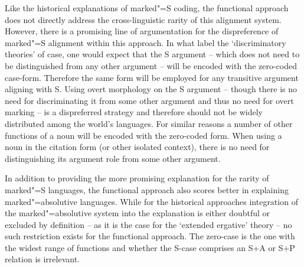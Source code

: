 Like the historical explanations of marked"=S coding, the functional approach does not directly address the cross-linguistic rarity of this alignment system.
However, there is a promising line of argumentation for the dispreference of marked"=S alignment within this approach.
In what \citet[91--93]{Mallinson:1981} label the `discriminatory theories' of case, one would expect that the S argument -- which does not need to be distinguished from any other argument -- will be encoded with the zero-coded case-form. 
Therefore the same form will be employed for any transitive argument aligning with S.
Using overt morphology on the S argument -- though there is no need for discriminating it from some other argument and thus no need for overt marking -- is a dispreferred strategy and therefore should not be widely distributed among the world's languages.
For similar reasons a number of other functions of a noun will be encoded with the zero-coded form. 
When using a noun in the citation form (or other isolated context), there is no need for distinguishing its argument role from some other argument. 

In addition to providing the more promising explanation for the rarity of mark\-ed"=S languages, the functional approach also scores better in explaining marked"=absolutive languages. While for the historical approaches integration of the marked"=absolutive system into the explanation is either doubtful or excluded by definition -- as it is the case for the `extended ergative' theory -- no such restriction exists for the functional approach. 
The zero-case is the one with the widest range of functions and whether the S-case comprises an S+A or S+P relation is irrelevant. 
          


